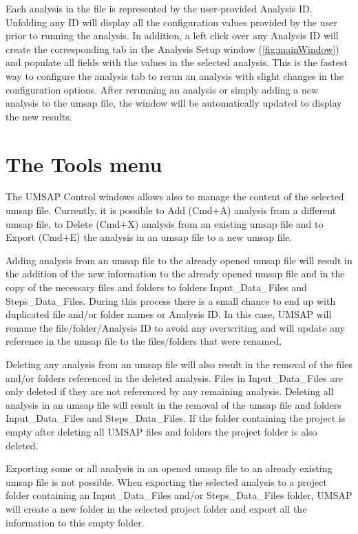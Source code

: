Each analysis in the file is represented by the user-provided Analysis ID. Unfolding
any ID will display all the configuration values provided by the user prior to running
the analysis. In addition, a left click over any Analysis ID will create the corresponding
tab in the Analysis Setup window (\autoref{fig:mainWindow}) and populate all fields
with the values in the selected analysis. This is the fastest way to configure the
analysis tab to rerun an analysis with slight changes in the configuration options.
After rerunning an analysis or simply adding a new analysis to the umsap file, the
window will be automatically updated to display the new results.

\section{The Tools menu}

The UMSAP Control windows allows also to manage the content of the selected umsap
file. Currently, it is possible to Add (Cmd+A) analysis from a different umsap
file, to Delete (Cmd+X) analysis from an existing umsap file and to Export (Cmd+E)
the analysis in an umsap file to a new umsap file.

Adding analysis from an umsap file to the already opened umsap file will result
in the addition of the new information to the already opened umsap file and in the
copy of the necessary files and folders to folders Input{\_}Data{\_}Files and
Steps{\_}Data{\_}Files. During this process there is a small chance to end up with
duplicated file and/or folder names or Analysis ID. In this case, UMSAP will rename
the file/folder/Analysis ID to avoid any overwriting and will update any reference
in the umsap file to the files/folders that were renamed.

Deleting any analysis from an umsap file will also result in the removal of the
files and/or folders referenced in the deleted analysis. Files in Input{\_}Data{\_}Files
are only deleted if they are not referenced by any remaining analysis. Deleting
all analysis in an umsap file will result in the removal of the umsap file and folders
Input{\_}Data{\_}Files and Steps{\_}Data{\_}Files. If the folder containing the
project is empty after deleting all UMSAP files and folders the project folder is
also deleted.

Exporting some or all analysis in an opened umsap file to an already existing umsap
file is not possible. When exporting the selected analysis to a project folder containing
an Input{\_}Data{\_}Files and/or Steps{\_}Data{\_}Files folder, UMSAP will create a new
folder in the selected project folder and export all the information to this empty
folder.


